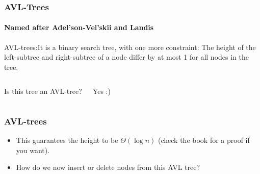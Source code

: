 \begin{frame}
	\frametitle{AVL-Trees}
	\framesubtitle{Named after Adel'son-Vel'skii and Landis}

AVL-trees:It is a binary search tree, with one more constraint:
			The height of the left-subtree and right-subtree of a node differ by at most 1 for all nodes in the tree.

	\begin{columns}[T]


			Is this tree an AVL-tree?
		
			Yes :)	
	\end{columns}
\end{frame}

\begin{frame}
	\frametitle{AVL-trees}
		\begin{itemize}
			\item This guarantees the height to be $\Theta(\log n)$ (check the book for a proof if you want).
			\item How do we now insert or delete nodes from this AVL tree?
	\end{itemize}
\end{frame}

